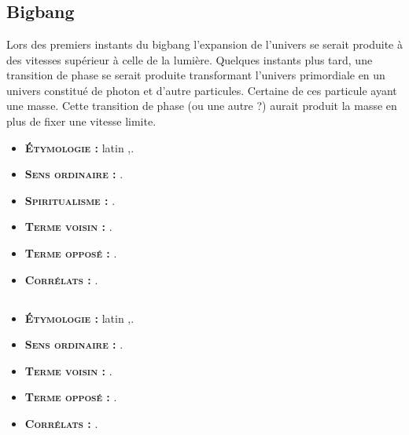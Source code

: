 \chapter{}
\section{Bigbang}

Lors des premiers instants du bigbang l'expansion de l'univers se serait produite à des vitesses supérieur à celle de la lumière.
Quelques instants plus tard, une transition de phase se serait produite transformant l'univers primordiale en un univers constitué de photon et d'autre particules.
Certaine de ces particule ayant une masse.
Cette transition de phase (ou une autre ?) aurait produit la masse en plus de fixer une vitesse limite.





{\footnotesize
\begin{itemize}[leftmargin=1cm, label=, itemsep=1pt]
\item {\bf \textsc{Étymologie} :} latin {\it },.
\item {\bf \textsc{Sens ordinaire} :} .
\item {\bf \textsc{Spiritualisme} :} .
\end{itemize}

\begin{itemize}[leftmargin=1cm, label=, itemsep=1pt]
\item {\bf \textsc{Terme voisin} :} .
\item {\bf \textsc{Terme opposé} :} .
\item {\bf \textsc{Corrélats} :} .
\end{itemize}
}

\section{}
{\footnotesize
\begin{itemize}[leftmargin=1cm, label=, itemsep=1pt]
\item {\bf \textsc{Étymologie} :} latin {\it },.
\item {\bf \textsc{Sens ordinaire} :} .
\item {\bf \textsc{Terme voisin} :} .
\item {\bf \textsc{Terme opposé} :} .
\item {\bf \textsc{Corrélats} :} .
\end{itemize}
}

